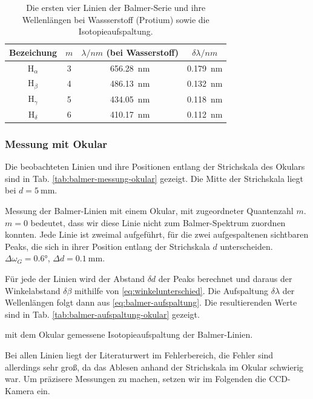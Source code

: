 \documentclass{article}
\begin{document}
\begin{table}[h]
  \centering
  \begin{tabular}{c||c|c|c}
    Bezeichung & $m$ & $\lambda/\si{nm}$ (bei Wasserstoff) & $\delta \lambda/\si{nm}$ \\ \hline
    H$_\alpha$ & 3 & \SI{656.28}{\nm} & \SI{0.179}{\nm} \\
    H$_\beta$  & 4 & \SI{486.13}{\nm} & \SI{0.132}{\nm} \\
    H$_\gamma$ & 5 & \SI{434.05}{\nm} & \SI{0.118}{\nm} \\
    H$_\delta$ & 6 & \SI{410.17}{\nm} & \SI{0.112}{\nm}
  \end{tabular}
  \caption{Die ersten vier Linien der Balmer-Serie und ihre Wellenlängen bei Wassserstoff (Protium) sowie die Isotopieaufspaltung. \cite{leybold-balmer}}
  \label{tab:balmer-literatur}
\end{table}

\subsubsection{Messung mit Okular}
Die beobachteten Linien und ihre Positionen entlang der Strichskala des Okulars sind in Tab. \ref{tab:balmer-messung-okular}
gezeigt. Die Mitte der Strichskala liegt bei $d = \SI{5}{\mm}$.
\begin{table}[h]
  \centering
  \caption{Messung der Balmer-Linien mit einem Okular, mit zugeordneter Quantenzahl $m$.
  $m=0$ bedeutet, dass wir diese Linie nicht zum Balmer-Spektrum zuordnen konnten.
  Jede Linie ist zweimal aufgeführt, für die zwei aufgespaltenen sichtbaren Peaks, die sich in ihrer Position entlang der Strichskala $d$ unterscheiden.
  $\Delta \omega_G=\ang{0.6}$, $\Delta d=\SI{0.1}{\mm}$.}
  \label{tab:balmer-messung-okular}
\end{table}

Für jede der Linien wird der Abstand $\delta d$ der Peaks berechnet und daraus
der Winkelabstand $\delta \beta$ mithilfe von \eqref{eq:winkelunterschied}.
Die Aufspaltung $\delta \lambda$ der Wellenlängen folgt dann aus \eqref{eq:balmer-aufspaltung}.
Die resultierenden Werte sind in Tab. \ref{tab:balmer-aufspaltung-okular} gezeigt.
\begin{table}
  \caption{mit dem Okular gemessene Isotopieaufspaltung der Balmer-Linien.}
  \label{tab:balmer-aufspaltung-okular}
\end{table}

Bei allen Linien liegt der Literaturwert im Fehlerbereich, die Fehler sind allerdings sehr groß,
da das Ablesen anhand der Strichskala im Okular schwierig war.
Um präzisere Messungen zu machen, setzen wir im Folgenden die CCD-Kamera ein.
\end{document}
